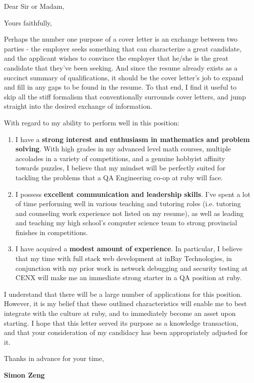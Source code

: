 \documentclass[12pt,a4paper,sans]{moderncv}        %
\begin{document}
\date{January 28, 2019}
\opening{Dear Sir or Madam,}
\closing{Yours faithfully,}
\makelettertitle

Perhaps the number one purpose of a cover letter is an exchange between two 
parties - the employer seeks something that can characterize a great candidate, 
and the applicant wishes to convince the employer that he/she is the great 
candidate that they've been seeking. And since the resume already exists as a 
succinct summary of qualifications, it should be the cover letter's job to 
expand and fill in any gaps to be found in the resume. To that end, I find it 
useful to skip all the stiff formalism that conventionally surrounds cover letters, 
and jump straight into the desired exchange of information.

With regard to my ability to perform well in this position:
\smallskip
\begin{enumerate}
    \item I have a \textbf{strong interest and enthusiasm in mathematics and 
            problem solving}. With high grades in my advanced level math 
        courses, multiple accolades in a variety of competitions, and a genuine 
        hobbyist affinity towards puzzles, I believe that my mindset will be 
        perfectly suited for tackling the problems that a QA Engineering 
        co-op at ruby will face. 
        \smallskip
    \item I possess \textbf{excellent communication and leadership skills}. I've 
        spent a lot of time performing well in various teaching and tutoring 
        roles (i.e. tutoring and counseling work experience not listed on my 
        resume), as well as leading and teaching my high school's computer 
        science team to strong provincial finishes in competitions.
        \smallskip
    \item I have acquired a \textbf{modest amount of experience}. In particular, 
        I believe that my time with full stack web development at inBay 
        Technologies, in conjunction with my prior work in network debugging and 
        security testing at CENX will make me an immediate strong starter in 
        a QA position at ruby. 
\end{enumerate}

I understand that there will be a large number of applications for this 
position. However, it is my belief that these outlined characteristics will 
enable me to best integrate with the culture at ruby, and to 
immediately become an asset upon starting. I hope that this letter served its 
purpose as a knowledge transaction, and that your consideration of my candidacy 
has been appropriately adjusted for it.
\smallskip

Thanks in advance for your time,

\textbf{Simon Zeng}

\end{document}
